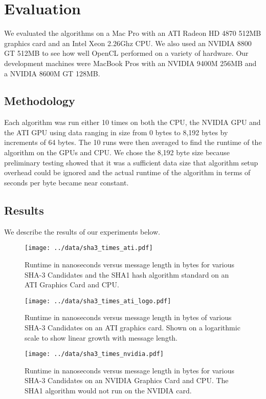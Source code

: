 \section*{Evaluation}
We evaluated the algorithms on a Mac Pro with an ATI Radeon HD 4870 512MB graphics card and an Intel Xeon 2.26Ghz CPU.
We also used an NVIDIA 8800 GT 512MB to see how well OpenCL performed on a variety of hardware.
Our development machines were MacBook Pros with an NVIDIA 9400M 256MB and a NVIDIA 8600M GT 128MB.

\subsection*{Methodology}
Each algorithm was run either 10 times on both the CPU, the NVIDIA GPU and the ATI GPU using data ranging in size from 0 bytes to 8,192 bytes by increments of 64 bytes.
The 10 runs were then averaged to find the runtime of the algorithm on the GPUs and CPU.
We chose the 8,192 byte size because preliminary testing showed that it was a sufficient data size that algorithm setup overhead could be ignored and the actual runtime of the algorithm in terms of seconds per byte became near constant.

\subsection*{Results}

We describe the results of our experiments below.

\begin{figure}[p]
\texttt{[image: ../data/sha3\_times\_ati.pdf]}
\caption{Runtime in nanoseconds versus message length in bytes for various SHA-3 Candidates and the SHA1 hash algorithm standard on an ATI Graphics Card and CPU.}\label{fig:sha3_times_ati}
\end{figure}

\begin{figure}[p]
\texttt{[image: ../data/sha3\_times\_ati\_logo.pdf]}
\caption{Runtime in nanoseconds versus message length in bytes of various SHA-3 Candidates on an ATI graphics card. Shown on a logarithmic scale to show linear growth with message length.}\label{fig:ati_logo}
\end{figure}

\begin{figure}[p]
\texttt{[image: ../data/sha3\_times\_nvidia.pdf]}
\caption{Runtime in nanoseconds versus message length in bytes for various SHA-3 Candidates on an NVIDIA Graphics Card and CPU. The SHA1 algorithm would not run on the NVIDIA card.}\label{fig:sha3_times_nvidia}
\end{figure}

